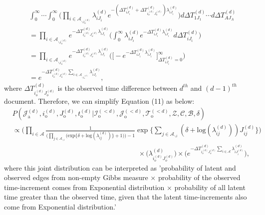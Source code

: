 \documentclass[a4paper]{article}
\begin{document}
  	       \begin{equation}
  	       \begin{aligned}
  	       &\int_{0}^\infty\cdots\int_{0}^\infty \Big(\prod_{i\in \mathcal{A}_{\backslash i_o^{(d)}}} \lambda^{(d)}_{iJ_i}e^{-(\Delta T^{(d)}_{iJ_i} + \Delta T^{(d)}_{i_o^{(d)}J_o^{(d)}})\lambda^{(d)}_{iJ_i}} \Big)d\Delta T^{(d)}_{1J_1}\cdots d\Delta T^{(d)}_{AJ_A}\\&
  	       = \prod_{i\in \mathcal{A}_{\backslash i_o^{(d)}}} e^{- \Delta T^{(d)}_{i_o^{(d)}J_o^{(d)}}\lambda^{(d)}_{iJ_i}} \Big(\int_{0}^\infty \lambda^{(d)}_{iJ_i}e^{-\Delta T^{(d)}_{iJ_i} \lambda^{(d)}_{iJ_i}}  d\Delta T^{(d)}_{iJ_i}\Big)
  	       \\& =\prod_{i\in \mathcal{A}_{\backslash i_o^{(d)}}} e^{- \Delta T^{(d)}_{i_o^{(d)}J_o^{(d)}}\lambda^{(d)}_{iJ_i}} \Big(\Big [ - e^{-\Delta T^{(d)}_{iJ_i} \lambda^{(d)}_{iJ_i}}\Big]_{\Delta T^{(d)}_{iJ_i}  = 0} ^{\infty}\Big)
  	       \\& = e^{- \Delta T^{(d)}_{i_o^{(d)}J_o^{(d)}}\sum_{i\in \mathcal{A}_{\backslash i_o^{(d)}}}\lambda^{(d)}_{iJ_i}},
  	       \end{aligned}
  	       \end{equation}
  	       where $\Delta T^{(d)}_{i_o^{(d)}J_o^{(d)}}$ is the observed time difference between $d^{th}$ and $(d-1)^{th}$ document.
  	       Therefore, we can simplify Equation (11) as below:
  	       \begin{equation}
  	       \begin{aligned}
  	       &P(\mathcal{J}^{(d)}_{\mbox{a}}, i^{(d)}_{\mbox{o}}, J^{(d)}_{\mbox{o}}, t^{(d)}_{\mbox{o}} |\mathcal{I}^{(<d)}_{\mbox{o}}, \mathcal{J}^{(<d)}_{\mbox{o}}, \mathcal{T}^{(<d)}_{\mbox{o}}, \mathcal{Z}, \mathcal{C}, \mathcal{B}, \delta)\\&\propto \Big(\prod_{i\in \mathcal{A}}\frac{1}{\Big(\prod_{j \in \mathcal{A}_{\backslash i}} \Big(\mbox{exp}\{\delta+\mbox{log}(\lambda_{ij}^{(d)})\} + 1\Big)\Big)-1}\exp\Big\{ \sum_{j \in \mathcal{A}_{\backslash i}} (\delta+\mbox{log}(\lambda_{ij}^{(d)}))J_{ij}^{(d)} \Big\}\Big)\\&\quad\quad\quad\quad\quad\quad\quad\quad\quad\quad\quad\quad\quad\quad\quad\quad\quad\quad\times \Big(\lambda^{(d)}_{i_o^{(d)}J_{o}^{(d)}}\Big)\times\Big( e^{-\Delta T^{(d)}_{i_o^{(d)}J_o^{(d)}}\sum\limits_{i\in \mathcal{A}}\lambda^{(d)}_{iJ^{(d)}_{i}}}\Big),
  	       \end{aligned}
  	       \end{equation}
  	       where this joint distribution can be interpreted as 'probability of latent and observed edges from non-empty Gibbs measure $\times$ probability of the observed time-increment comes from Exponential distribution $\times$ probability of all latent time greater than the observed time, given that the latent time-increments also come from Exponential distribution.'
\end{document}
